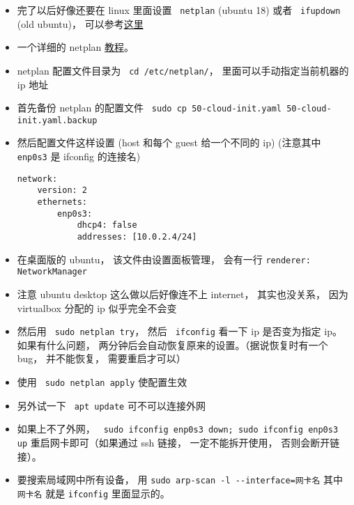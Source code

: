 \begin{itemize}
\item 完了以后好像还要在 linux 里面设置 \verb` netplan` (ubuntu 18) 或者 \verb` ifupdown` (old ubuntu)， 可以参考\href{https://www.linux.com/tutorials/how-use-netplan-network-configuration-tool-linux/}{这里}
\item 一个详细的 netplan \href{https://linuxconfig.org/netplan-network-configuration-tutorial-for-beginners}{教程}。
\item netplan 配置文件目录为 \verb` cd /etc/netplan/`， 里面可以手动指定当前机器的 ip 地址
\item 首先备份 netplan 的配置文件 \verb` sudo cp 50-cloud-init.yaml 50-cloud-init.yaml.backup`
\item 然后配置文件这样设置 (host 和每个 guest 给一个不同的 ip) (注意其中 \verb` enp0s3` 是 ifconfig 的连接名)
\begin{lstlisting}[language=none]
network:
    version: 2
    ethernets:
        enp0s3:
            dhcp4: false
            addresses: [10.0.2.4/24]
\end{lstlisting}
\item 在桌面版的 ubuntu， 该文件由设置面板管理， 会有一行 \verb`renderer: NetworkManager`
\item 注意 ubuntu desktop 这么做以后好像连不上 internet， 其实也没关系， 因为 virtualbox 分配的 ip 似乎完全不会变
\item 然后用 \verb` sudo netplan try`， 然后 \verb` ifconfig` 看一下 ip 是否变为指定 ip。 如果有什么问题， 两分钟后会自动恢复原来的设置。（据说恢复时有一个 bug， 并不能恢复， 需要重启才可以）
\item 使用 \verb` sudo netplan apply` 使配置生效
\item 另外试一下 \verb` apt update` 可不可以连接外网
\item 如果上不了外网， \verb` sudo ifconfig enp0s3 down; sudo ifconfig enp0s3 up` 重启网卡即可（如果通过 ssh 链接， 一定不能拆开使用， 否则会断开链接）。
\item 要搜索局域网中所有设备， 用 \verb`sudo arp-scan -l --interface=网卡名` 其中 \verb`网卡名` 就是 \verb`ifconfig` 里面显示的。
\end{itemize}

